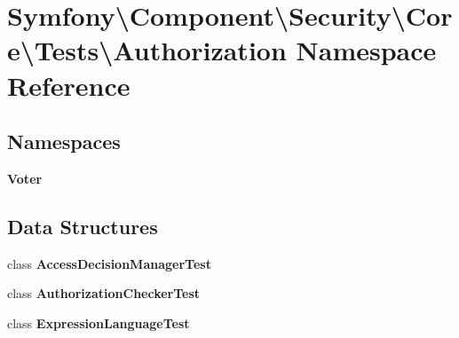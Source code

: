\section{Symfony\textbackslash{}Component\textbackslash{}Security\textbackslash{}Core\textbackslash{}Tests\textbackslash{}Authorization Namespace Reference}
\label{namespace_symfony_1_1_component_1_1_security_1_1_core_1_1_tests_1_1_authorization}
\subsection*{Namespaces}
\begin{DoxyCompactItemize}
\item 
 {\bf Voter}
\end{DoxyCompactItemize}
\subsection*{Data Structures}
\begin{DoxyCompactItemize}
\item 
class {\bf Access\+Decision\+Manager\+Test}
\item 
class {\bf Authorization\+Checker\+Test}
\item 
class {\bf Expression\+Language\+Test}
\end{DoxyCompactItemize}
